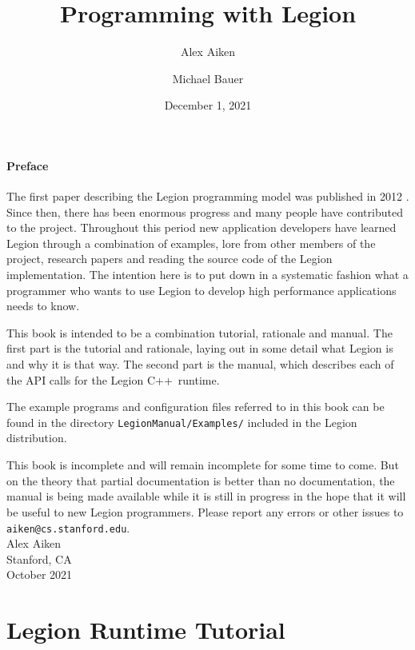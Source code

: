 \documentclass[11pt]{book}
\newcommand{\legionbook}[1]{{\tt LegionManual/Examples/#1}}
\newcommand{\Cpp}{C++}
\begin{document}
\title{Programming with Legion}
\author{Alex Aiken \and Michael Bauer}
\date{December 1, 2021}
\maketitle

\subsection*{Preface}

The first paper describing the Legion programming model
was published in 2012 \cite{Legion12}.  Since then, there has been
enormous progress and many people have contributed to
the project.  Throughout this period new application developers have
learned Legion through a combination of examples, lore from other
members of the project, research papers and reading the source code of
the Legion implementation.  The intention here is to put down in 
a systematic fashion what a programmer who wants to use
Legion to develop high performance applications needs to know.

This book is intended to be a combination tutorial, rationale and
manual.  The first part is the tutorial and rationale, laying out in some
detail what Legion is and why it is that way.  The second part is the manual, which describes
each of the API calls for the Legion \Cpp\ runtime.

The example programs and configuration files referred to in this book can be found in the directory
\legionbook{} included in the Legion distribution.

This book is incomplete and will remain incomplete for
some time to come.  But on the theory that partial documentation is better than no
documentation, the manual is being made available while it is
still in progress in the hope that it will be useful to new Legion
programmers.  Please report any errors or other issues to {\tt
  aiken@cs.stanford.edu}. \\[2in] Alex Aiken\\ Stanford, CA \\
October 2021

\tableofcontents

\part{Legion Runtime Tutorial}












\end{document}
